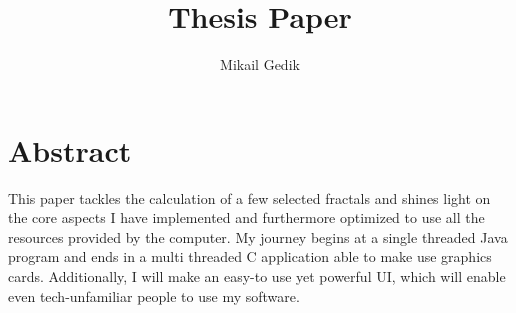 \documentclass[10pt,a4paper,titlepage]{article}
\author{Mikail Gedik}
\title{Thesis Paper}
\begin{document}
	\maketitle
	\tableofcontents
	\listoffigures
	\clearpage
	
	\section{Abstract}
	This paper tackles the calculation of a few selected fractals and shines light on the core aspects I have implemented and furthermore optimized to use all the resources provided by the computer. My journey begins at a single threaded Java program and ends in a multi threaded C application able to make use graphics cards. Additionally, I will make an easy-to use yet powerful UI, which will enable even tech-unfamiliar people to use my software.
\end{document}
